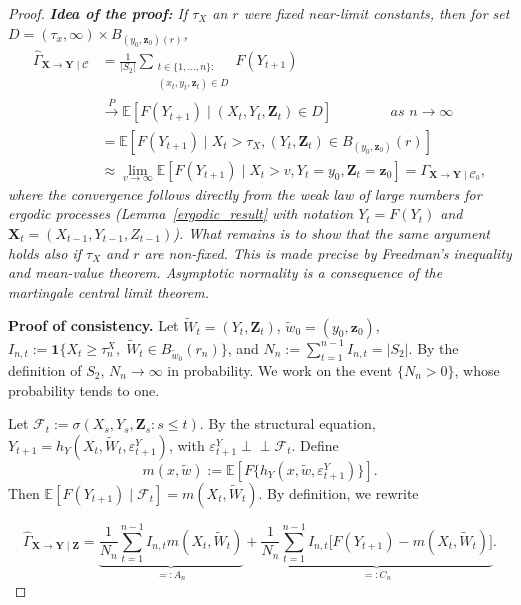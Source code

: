 \documentclass[a4paper,11pt]{article}
\begin{document}
\begin{proof}
\textit{\textbf{Idea of the proof: }If $\tau_X$ an $r$ were fixed near-limit constants, then for set $D =(\tau_x, \infty)\times B_{(y_0, \textbf{z}_0)(r)}$,}
\begin{equation*}
\begin{split}
      \hat{\Gamma}_{\textbf{X}\to\textbf{Y}\mid\mathcal{C}} &=\frac{1}{|S_2|}\sum_{\substack{t\in\{1, \dots, n\}: \\ (x_t, y_t, \textbf{z}_t)\in D }}  F(Y_{t+1}) \\&
    \overset{P}{\to} \mathbb{E}[ F(Y_{t+1})\mid (X_t, Y_t, \textbf{Z}_t)\in D] \qquad \qquad \,as\,\,n\to\infty\\&=  
     \mathbb{E}[ F(Y_{t+1})\mid X_t>\tau_X,(Y_t ,\textbf{Z}_t) \in B_{(y_0, \textbf{z}_0)}(r)]
    \\&
    \approx \lim_{v\to\infty} \mathbb{E}[ F(Y_{t+1})\mid X_t>v,Y_t = y_0, \textbf{Z}_t = \textbf{z}_0] = \Gamma_{\textbf{X}\to\textbf{Y}\mid\mathcal{C}_0}, 
\end{split}
\end{equation*}
\textit{where the convergence follows directly from the weak law of large numbers for ergodic processes (Lemma~\ref{ergodic_result} with notation $Y_t = F(Y_t)$ and $\textbf{X}_t = (X_{t-1}, Y_{t-1}, Z_{t-1})$). What remains is to show that the same argument holds also if $\tau_X$ and $r$ are non-fixed. This is made precise by Freedman's inequality and mean-value theorem. Asymptotic normality is a consequence of the martingale central limit theorem.}

\textbf{Proof of consistency. } Let \(\tilde W_t=(Y_t,\mathbf Z_t)\), \(\tilde w_0=(y_0,\mathbf z_0)\),
\(I_{n,t}:=\mathbf 1\{X_t\ge \tau_n^X,\; \tilde W_t\in B_{\tilde w_0}(r_n)\}\), and
\(N_n:=\sum_{t=1}^{n-1}I_{n,t}=|S_2|\). By the definition of \(S_2\),
\(N_n\to\infty\) in probability. We work on the event \(\{N_n>0\}\), whose
probability tends to one.

Let \(\mathcal F_t:=\sigma(X_s,Y_s,\mathbf Z_s:s\le t)\). By the structural equation,
\(Y_{t+1}=h_Y(X_t,\tilde W_t,\varepsilon^Y_{t+1})\), with
\(\varepsilon^Y_{t+1}\perp\!\!\!\perp\mathcal F_t\). Define
\[
    m(x,\tilde w):=
    \mathbb E\!\left[
        F\{h_Y(x,\tilde w,\varepsilon^Y_{t+1})\}
    \right].
\]
Then \(\mathbb E[F(Y_{t+1})\mid\mathcal F_t]=m(X_t,\tilde W_t)\). By definition, we rewrite

\[
\hat{\Gamma}_{\mathbf X\to\mathbf Y\mid\mathbf Z}
=
\underbrace{
\frac{1}{N_n}\sum_{t=1}^{n-1} I_{n,t}m(X_t,\tilde W_t)
}_{=:A_n}
+
\underbrace{
\frac{1}{N_n}\sum_{t=1}^{n-1} I_{n,t}
\bigl[F(Y_{t+1})-m(X_t,\tilde W_t)\bigr]
}_{=:C_n}.
\]


\end{proof}
\end{document}
